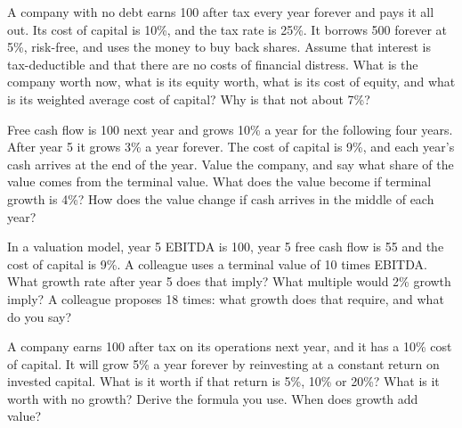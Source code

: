 \begin{question}\label{iq:iv2:valuation-and-financial-statements:9}
A company with no debt earns 100 after tax every year forever and pays it all out. Its cost of capital is 10\%, and the tax rate is 25\%. It borrows 500 forever at 5\%, risk-free, and uses the money to buy back shares. Assume that interest is tax-deductible and that there are no costs of financial distress. What is the company worth now, what is its equity worth, what is its cost of equity, and what is its weighted average cost of capital? Why is that not about 7\%?
\end{question}

\begin{question}\label{iq:iv2:valuation-and-financial-statements:10}
Free cash flow is 100 next year and grows 10\% a year for the following four years. After year 5 it grows 3\% a year forever. The cost of capital is 9\%, and each year's cash arrives at the end of the year. Value the company, and say what share of the value comes from the terminal value. What does the value become if terminal growth is 4\%? How does the value change if cash arrives in the middle of each year?
\end{question}

\begin{question}\label{iq:iv2:valuation-and-financial-statements:11}
In a valuation model, year 5 EBITDA is 100, year 5 free cash flow is 55 and the cost of capital is 9\%. A colleague uses a terminal value of 10 times EBITDA. What growth rate after year 5 does that imply? What multiple would 2\% growth imply? A colleague proposes 18 times: what growth does that require, and what do you say?
\end{question}

\begin{question}\label{iq:iv2:valuation-and-financial-statements:12}
A company earns 100 after tax on its operations next year, and it has a 10\% cost of capital. It will grow 5\% a year forever by reinvesting at a constant return on invested capital. What is it worth if that return is 5\%, 10\% or 20\%? What is it worth with no growth? Derive the formula you use. When does growth add value?
\end{question}

